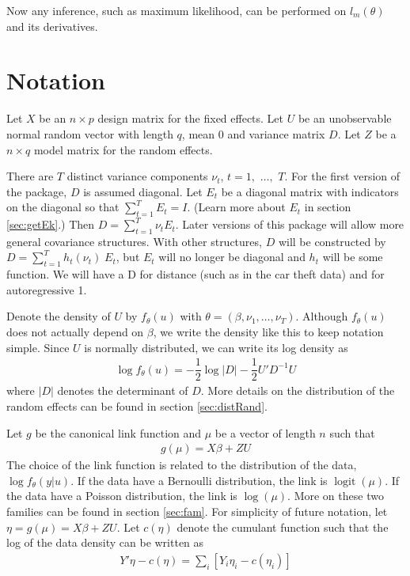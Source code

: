\documentclass{article}
\DeclareMathOperator{\logit}{logit}
\begin{document}
Now any inference, such as maximum likelihood, can be performed on $l_m(\theta)$ and its derivatives.  





\section{Notation}

 Let $X$ be an $n \times p$ design matrix for the fixed effects.  Let $U$ be an unobservable normal random vector with length $q$, mean $0$ and variance matrix $D$. Let $Z$ be a $n \times q$ model matrix for the random effects. 

There are $T$ distinct variance components  $\nu_t$, $t = 1,$ $\ldots,$ $T$.  For the first version of the package, $D$ is assumed diagonal. Let $E_t$ be a diagonal matrix with indicators on the diagonal so that $\sum_{t=1}^T E_t = I$. (Learn more about $E_t$ in section \ref{sec:getEk}.) Then $D= \sum_{t=1}^T \nu_t E_t$.  Later versions of this package will allow  more general covariance structures. With other structures, $D$ will be constructed by $D= \sum_{t=1}^T h_t (\nu_t) \; E_t$, but $E_t$ will no longer be diagonal and $h_t$ will be some function. We will have a D for distance (such as in the car theft data) and for autoregressive 1.

 Denote the density of $U$ by $f_\theta(u)$  with $\theta= (\beta,\nu_{1},\ldots,\nu_T)$. Although $f_\theta(u)$ does not actually depend on $\beta$, we write the density like this to keep notation simple. Since $U$ is normally distributed, we can write its log density as
\begin{align}
\log f_\theta(u) = -\dfrac{1}{2} \log |D| -\dfrac{1}{2} U' D^{-1} U
\end{align}
where $|D|$ denotes the determinant of $D$.  More details on the distribution of the random effects can be found in section \ref{sec:distRand}.

Let $g$ be the canonical link function and $\mu$ be a vector of length $n$ such that
\begin{align}
g(\mu) = X \beta + Z U
\end{align}
The choice of the link function is related to the distribution of the data, $\log f_\theta(y|u)$. If the data have a  Bernoulli distribution, the link is $\logit(\mu)$. If the data have a Poisson distribution, the link is $\log (\mu)$. More on these two families can be found in section \ref{sec:fam}. For simplicity of future notation, let $\eta=g(\mu)=X \beta + Z U$. Let $c(\eta)$ denote the cumulant function such that the log of the data density can be written as
\begin{align}
Y' \eta - c(\eta) = \sum_i \left[ Y_i \eta_i - c(\eta_i)  \right]
\end{align}
\end{document}
